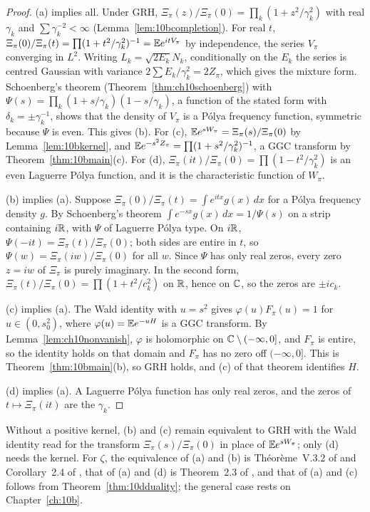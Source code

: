 \begin{proof}
(a) implies all. Under GRH, $\Xi_\pi(z)/\Xi_\pi(0) = \prod_k(1+z^2/\gamma_k^2)$ with real $\gamma_k$ and $\sum\gamma_k^{-2}<\infty$ (Lemma~\ref{lem:10bcompletion}). For real $t$, $\Xi_\pi(0)/\Xi_\pi(t) = \prod(1+t^2/\gamma_k^2)^{-1} = \mathbb{E} e^{itV_\pi}$ by independence, the series $V_\pi$ converging in $L^2$. Writing $L_k = \sqrt{2E_k}N_k$, conditionally on the $E_k$ the series is centred Gaussian with variance $2\sum E_k/\gamma_k^2 = 2Z_\pi$, which gives the mixture form. Schoenberg's theorem (Theorem~\ref{thm:ch10schoenberg}) with $\Psi(s) = \prod_k(1+s/\gamma_k)(1-s/\gamma_k)$, a function of the stated form with $\delta_k = \pm\gamma_k^{-1}$, shows that the density of $V_\pi$ is a P\'olya frequency function, symmetric because $\Psi$ is even. This gives (b). For (c), $\mathbb{E} e^{sW_\pi} = \Xi_\pi(s)/\Xi_\pi(0)$ by Lemma~\ref{lem:10bkernel}, and $\mathbb{E} e^{-s^2Z_\pi} = \prod(1+s^2/\gamma_k^2)^{-1}$, a GGC transform by Theorem~\ref{thm:10bmain}(c). For (d), $\Xi_\pi(it)/\Xi_\pi(0) = \prod(1-t^2/\gamma_k^2)$ is an even Laguerre P\'olya function, and it is the characteristic function of $W_\pi$.

(b) implies (a). Suppose $\Xi_\pi(0)/\Xi_\pi(t) = \int e^{itx}g(x)\,dx$ for a P\'olya frequency density $g$. By Schoenberg's theorem $\int e^{-sx}g(x)\,dx = 1/\Psi(s)$ on a strip containing $i\mathbb{R}$, with $\Psi$ of Laguerre P\'olya type. On $i\mathbb{R}$, $\Psi(-it) = \Xi_\pi(t)/\Xi_\pi(0)$; both sides are entire in $t$, so $\Psi(w) = \Xi_\pi(iw)/\Xi_\pi(0)$ for all $w$. Since $\Psi$ has only real zeros, every zero $z = iw$ of $\Xi_\pi$ is purely imaginary. In the second form, $\Xi_\pi(t)/\Xi_\pi(0) = \prod(1+t^2/c_k^2)$ on $\mathbb{R}$, hence on $\mathbb{C}$, so the zeros are $\pm ic_k$.

(c) implies (a). The Wald identity with $u = s^2$ gives $\varphi(u)F_\pi(u) = 1$ for $u\in(0,s_0^2)$, where $\varphi(u) = \mathbb{E} e^{-uH}$ is a GGC transform. By Lemma~\ref{lem:ch10nonvanish}, $\varphi$ is holomorphic on $\mathbb{C}\setminus(-\infty,0]$, and $F_\pi$ is entire, so the identity holds on that domain and $F_\pi$ has no zero off $(-\infty,0]$. This is Theorem~\ref{thm:10bmain}(b), so GRH holds, and (c) of that theorem identifies $H$.

(d) implies (a). A Laguerre P\'olya function has only real zeros, and the zeros of $t\mapsto\Xi_\pi(it)$ are the $\gamma_k$.
\end{proof}

Without a positive kernel, (b) and (c) remain equivalent to GRH with the Wald identity read for the transform $\Xi_\pi(s)/\Xi_\pi(0)$ in place of $\mathbb{E} e^{sW_\pi}$; only (d) needs the kernel. For $\zeta$, the equivalence of (a) and (b) is Th\'eor\`eme~V.3.2 of \cite{roynetteyor2005} and Corollary~2.4 of \cite{konstantopoulospatiesarkar2024}, that of (a) and (d) is Theorem~2.3 of \cite{konstantopoulospatiesarkar2024}, and that of (a) and (c) follows from Theorem~\ref{thm:10dduality}; the general case rests on Chapter~\ref{ch:10b}.

